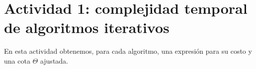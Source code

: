 \section{Actividad 1: complejidad temporal de algoritmos iterativos}
\label{sec:act1}

En esta actividad obtenemos, para cada algoritmo, una expresión para su costo y una cota
$\Theta$ ajustada.




